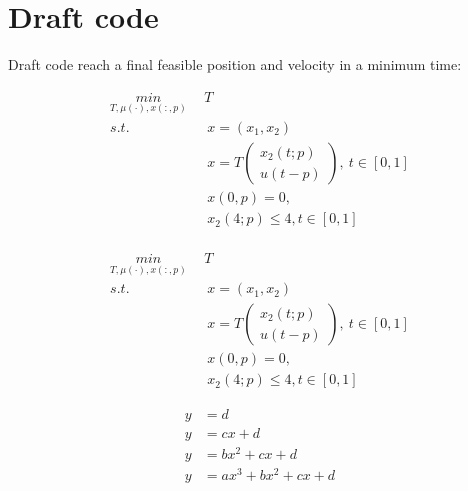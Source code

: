 

\chapter{Draft code }

Draft code 
 reach a final feasible position and velocity in a minimum time: 


\begin{equation}
	\begin{aligned}
		\underset{T, \mu(\cdot), x(:,p)}{min} \   & \  T \\ 
		s.t.  & \ \ x = (x_1, x_2)  \\ 
		& \ \  x = T  \begin{pmatrix}  x_2(t;p) \\ u(t-p)   \end{pmatrix}, \ t \in [0,1]   \\
		& \ \ x(0,p) = 0,\\
		& \ \ x_2(4;p) \leq 4, t \in [0,1] \\	
	 \end{aligned}
\end{equation}



\begin{subequations}
		\begin{align}
		\underset{T, \mu(\cdot), x(:,p)}{min} \   & \  T \\ 
		s.t.  & \ \ x = (x_1, x_2)   \label{sub-1:1} \\ 
		      & \ \  x = T  \begin{pmatrix}  x_2(t;p) \\ u(t-p)   \end{pmatrix}, \ t \in [0,1]  \label{sub-2:1} \\
		      & \ \ x(0,p) = 0, \label{sub-2:3}\\
		      & \ \ x_2(4;p) \leq 4, t \in [0,1] \label{sub-2:4}
	 	\end{align}
\end{subequations}


\begin{subequations}
	\begin{align}
		y & = d \\
		y & = cx + d \\
		y & = bx ^{2}+ cx + d \\
		y & = ax ^{3}+ bx ^{2}+ cx + d
	\end{align}
\end{subequations}


